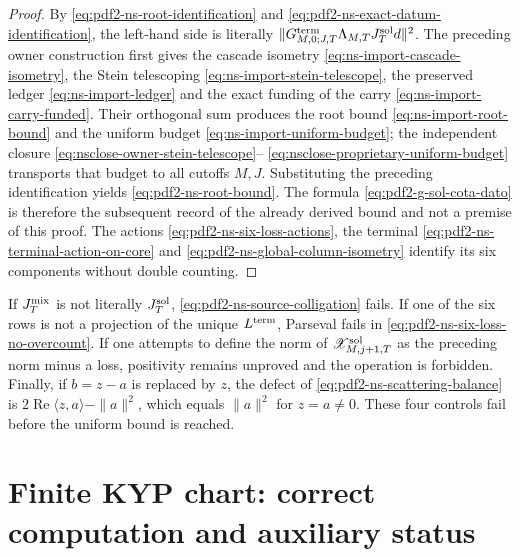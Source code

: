 \begin{proof}
By \eqref{eq:pdf2-ns-root-identification} and
\eqref{eq:pdf2-ns-exact-datum-identification}, the left-hand side is
literally
$\|\mathbf G_{M,0;J,T}^{\rm term}\Lambda_{M,T}J_T^{\rm sol}d\|^2$.
The preceding owner construction first gives the cascade isometry
\eqref{eq:ns-import-cascade-isometry}, the Stein telescoping
\eqref{eq:ns-import-stein-telescope}, the preserved ledger
\eqref{eq:ns-import-ledger} and the exact funding of the carry
\eqref{eq:ns-import-carry-funded}. Their orthogonal sum produces the root bound
\eqref{eq:ns-import-root-bound} and the uniform budget
\eqref{eq:ns-import-uniform-budget}; the independent closure
\eqref{eq:nsclose-owner-stein-telescope}--
\eqref{eq:nsclose-proprietary-uniform-budget} transports that budget to
all cutoffs \(M,J\). Substituting the preceding identification yields
\eqref{eq:pdf2-ns-root-bound}. The formula
\eqref{eq:pdf2-g-sol-cota-dato} is therefore the subsequent record of the
already derived bound and not a premise of this proof. The actions
\eqref{eq:pdf2-ns-six-loss-actions}, the terminal
\eqref{eq:pdf2-ns-terminal-action-on-core} and
\eqref{eq:pdf2-ns-global-column-isometry} identify its six components
without double counting.
\end{proof}

\begin{falsifier}
If $J_T^{\rm mix}$ is not literally $J_T^{\rm sol}$,
\eqref{eq:pdf2-ns-source-colligation} fails. If one of the six rows is not a
projection of the unique $L^{\rm term}$, Parseval fails in
\eqref{eq:pdf2-ns-six-loss-no-overcount}. If one attempts to define the norm of
$\mathscr X_{M,j+1,T}^{\rm sol}$ as the preceding norm minus a loss,
positivity remains unproved and the operation is forbidden. Finally, if
$b=z-a$ is replaced by $z$, the defect of
\eqref{eq:pdf2-ns-scattering-balance} is
$2\operatorname{Re}\langle z,a\rangle-\|a\|^2$, which equals $\|a\|^2$ for
$z=a\ne0$. These four controls fail before the uniform bound is reached.
\end{falsifier}

\section{Finite KYP chart: correct computation and auxiliary status}

